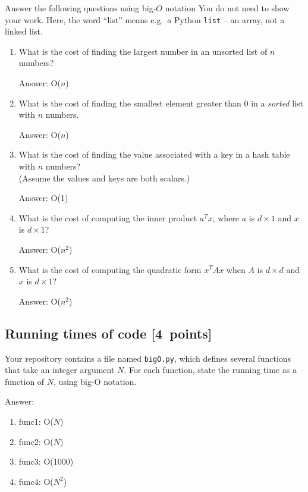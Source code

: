 \documentclass{article}
\newcommand{\blu}[1]{{\textcolor{blu}{#1}}}
\newenvironment{answer}{\par\begingroup\color{gre}Answer: }{\endgroup}
\let\ask\blu
\newcommand\pts[1]{\textcolor{pointscolour}{[#1~points]}}
\begin{document}
  \ask{Answer the following questions using big-$O$ notation} You do not need to show your work.
  Here, the word ``list'' means e.g.\ a Python \texttt{list} -- an array, not a linked list.
  \begin{enumerate}
  \item What is the cost of finding the largest number in an unsorted list of $n$ numbers?
  \begin{answer}
  O($n$)
  \end{answer}
  \item What is the cost of finding the smallest element greater than 0 in a \emph{sorted} list with $n$ numbers.
  \begin{answer}
  O($n$)
  \end{answer}
  \item What is the cost of finding the value associated with a key in a hash table with $n$ numbers? \\(Assume the values and keys are both scalars.)
  \begin{answer}
  O(1)
  \end{answer}
  \item What is the cost of computing the inner product $a^Tx$, where $a$ is $d \times 1$ and $x$ is $d \times 1$?
  \begin{answer}
  O($n^2$)
  \end{answer}
  \item What is the cost of computing the quadratic form $x^TAx$ when $A$ is $d \times d$ and $x$ is $d \times 1$?
  \begin{answer}
  O($n^2$)
  \end{answer}
  \end{enumerate}

  \subsection{Running times of code \pts{4}}

  Your repository contains a file named \texttt{bigO.py}, which defines several functions
  that take an integer argument $N$. For each function, \ask{state the running time as a function of $N$, using big-O notation}.

  \begin{answer}
  \begin{enumerate}
  \item func1: O($N$)
  \item func2: O($N$)
  \item func3: O(1000)
  \item func4: O($N^2$)
  \end{enumerate}
  \end{answer}
\end{document}
